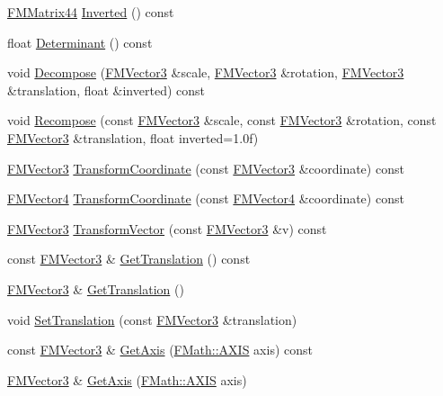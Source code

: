 \begin{DoxyCompactItemize}
\hyperlink{classFMMatrix44}{FMMatrix44} \hyperlink{classFMMatrix44_a7ca1ec95a49399822e76a02141c8ad6d}{Inverted} () const 
\item 
float \hyperlink{classFMMatrix44_a3cf521d2817eb5805615bf4cdfc236a7}{Determinant} () const 
\item 
void \hyperlink{classFMMatrix44_a565c41380a70cefc7345ea54f7b76b23}{Decompose} (\hyperlink{classFMVector3}{FMVector3} \&scale, \hyperlink{classFMVector3}{FMVector3} \&rotation, \hyperlink{classFMVector3}{FMVector3} \&translation, float \&inverted) const 
\item 
void \hyperlink{classFMMatrix44_a9e9a50217a5f6e740f136cd4e98663d3}{Recompose} (const \hyperlink{classFMVector3}{FMVector3} \&scale, const \hyperlink{classFMVector3}{FMVector3} \&rotation, const \hyperlink{classFMVector3}{FMVector3} \&translation, float inverted=1.0f)
\item 
\hyperlink{classFMVector3}{FMVector3} \hyperlink{classFMMatrix44_a392e17e091f3060b2334fd8d16154b02}{TransformCoordinate} (const \hyperlink{classFMVector3}{FMVector3} \&coordinate) const 
\item 
\hyperlink{classFMVector4}{FMVector4} \hyperlink{classFMMatrix44_a8e52daceeaf4bf3406b338c3d2e7f98a}{TransformCoordinate} (const \hyperlink{classFMVector4}{FMVector4} \&coordinate) const 
\item 
\hyperlink{classFMVector3}{FMVector3} \hyperlink{classFMMatrix44_a0b29840a9c34c143dadbf9710dc58b8a}{TransformVector} (const \hyperlink{classFMVector3}{FMVector3} \&v) const 
\item 
const \hyperlink{classFMVector3}{FMVector3} \& \hyperlink{classFMMatrix44_a35d12d59a240ca11f5e39d9ed900e446}{GetTranslation} () const 
\item 
\hyperlink{classFMVector3}{FMVector3} \& \hyperlink{classFMMatrix44_ac117c8c9b02c6b0ec6b8f909eaaab871}{GetTranslation} ()
\item 
void \hyperlink{classFMMatrix44_ac8050b21149aa37d26928346ba3a3b82}{SetTranslation} (const \hyperlink{classFMVector3}{FMVector3} \&translation)
\item 
const \hyperlink{classFMVector3}{FMVector3} \& \hyperlink{classFMMatrix44_a1d02eafef6d14756839924fc9214ed82}{GetAxis} (\hyperlink{namespaceFMath_a6cebb48ac4d487860bfb3000dc83464f}{FMath::AXIS} axis) const 
\item 
\hyperlink{classFMVector3}{FMVector3} \& \hyperlink{classFMMatrix44_a22972796adbaadaa9d2952d11711890b}{GetAxis} (\hyperlink{namespaceFMath_a6cebb48ac4d487860bfb3000dc83464f}{FMath::AXIS} axis)
\end{DoxyCompactItemize}
